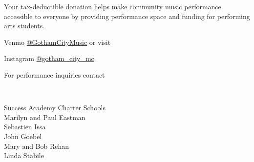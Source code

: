 \documentclass{article}[10pt]
\begin{document}
\begin{center}
\begin{minipage}{4in}
            \begin{small}
                Your tax-deductible donation helps make community music performance accessible to everyone by providing performance space and funding for performing arts students.\\
            \end{small}


            Venmo \href{https://account.venmo.com/u/GothamCityMusic}{@GothamCityMusic} or visit \textbf{}

            \begin{center}
            {\textbf{}}

                \faInstagram{}{}  Instagram  \href{https://www.instagram.com/gotham_city_mc/}{@gotham\_city\_mc}


                For performance inquiries contact
                    {\textbf{}}
            \end{center}

            \begin{center}
            {\textbf{}}
                \\

                \begin{small}
                    \vspace{-0.11in}
                    \begin{multicols*}{2}
                    {Success Academy Charter Schools}
                        \\
                        Marilyn and Paul Eastman\\
                        Sebastien Issa\\
                        John Goebel\\
                        Mary and Bob Rehan\\
                        Linda Stabile
                    \end{multicols*}
                \end{small}
            \end{center}

        \end{minipage}

    \end{center}
\end{document}
